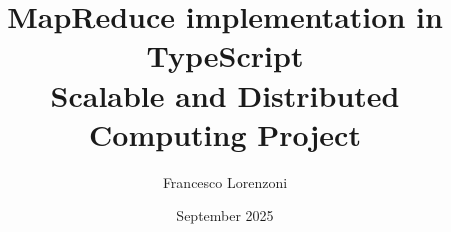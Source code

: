 


\lstset{language=JavaScript}

\title{MapReduce implementation in TypeScript \\Scalable and Distributed Computing Project}
\author{Francesco Lorenzoni}
\date{September 2025}



\maketitle
\tableofcontents




